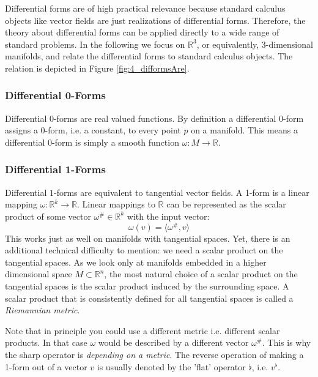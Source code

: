 \label{subsec:diffformsare}
Differential forms are of high practical relevance because standard calculus objects like vector fields are just realizations of differential forms. Therefore, the theory about differential forms can be applied directly to a wide range of standard problems. In the following we focus on $\mathbb R^3$, or equivalently, 3-dimensional manifolds, and relate the differential forms to standard calculus objects. The relation is depicted in Figure \ref{fig:4_difformsAre}.

\subsubsection{Differential 0-Forms}
Differential 0-forms are real valued functions. By definition a differential 0-form assigns a 0-form, i.e. a constant, to every point $p$ on a manifold. This means a differential 0-form is simply a smooth function $\omega: M \to \mathbb R$. 

\subsubsection*{Differential 1-Forms}
Differential $1$-forms are equivalent to tangential vector fields. A 1-form is a linear mapping $\omega: \mathbb R^k \rightarrow \mathbb R$. Linear mappings to $\mathbb R$ can be represented as the scalar product of some vector $\omega^{\#} \in \mathbb R ^k$ with the input vector:
\[\omega(v) = \langle \omega^{\#}, v \rangle\]
This works just as well on manifolds with tangential spaces. Yet, there is an additional technical difficulty to mention: we need a scalar product on the tangential spaces. As we look only at manifolds embedded in a higher dimensional space $M \subset \mathbb R^n$, the most natural choice of a scalar product on the tangential spaces is the scalar product induced by the surrounding space. A scalar product that is consistently defined for all tangential spaces is called a \emph{Riemannian metric}.

Note that in principle you could use a different metric i.e. different scalar products. In that case $\omega$ would be described by a different vector $\omega^{\#}$. This is why the sharp operator is \emph{depending on a metric}. The reverse operation of making a 1-form out of a vector $v$ is usually denoted by the 'flat' operator $\flat$, i.e. $v^\flat$.

